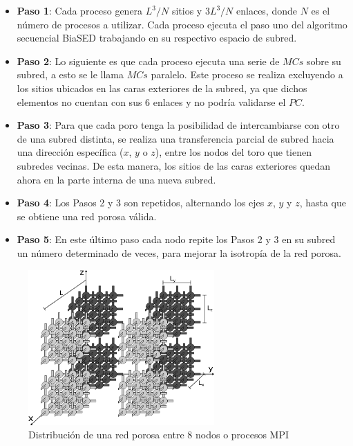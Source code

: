\begin{itemize}
\item[] \textbf{Paso 1}: Cada proceso genera $L^3/N$ sitios y $3L^3/N$ enlaces, donde $N$ es el número de procesos a utilizar. 
Cada proceso ejecuta el paso uno del algoritmo secuencial BiaSED trabajando en su respectivo espacio de subred.

\item[] \textbf{Paso 2}: Lo siguiente es que cada proceso ejecuta una serie de $MCs$ sobre su subred, a esto se le llama $MCs$ paralelo.
Este proceso se realiza excluyendo a los sitios ubicados en las caras exteriores de la subred, ya que dichos elementos no cuentan
con sus 6 enlaces y no podría validarse el $PC$.

\item[] \textbf{Paso 3}: Para que cada poro tenga la posibilidad de intercambiarse con otro de una subred distinta, se realiza una 
transferencia parcial de subred hacia una dirección específica ($x$, $y$ o $z$), entre los nodos del toro que tienen subredes vecinas. 
De esta manera, los sitios de las caras exteriores quedan ahora en la parte interna de una nueva subred. 

\item[] \textbf{Paso 4}: Los Pasos 2 y 3 son repetidos, alternando los ejes $x$, $y$ y $z$, hasta que se obtiene una red porosa válida.
\item[] \textbf{Paso 5}: En este último paso cada nodo repite los Pasos 2 y 3  en su subred un número determinado de veces, para mejorar la isotropía de la red porosa.
\end{itemize}

\begin{figure}[hbtp]
\centering
\includegraphics[width=2.8in]{img/distribucion}
\caption{Distribución de una red porosa entre 8 nodos o procesos MPI}
\label{fig:distribucion_rw}
\end{figure}


